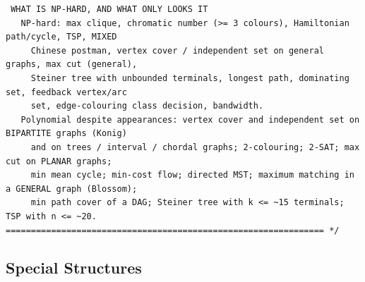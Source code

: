 \documentclass[9pt,a4paper,twocolumn]{extarticle}
\begin{document}
\begin{lstlisting}
 WHAT IS NP-HARD, AND WHAT ONLY LOOKS IT
   NP-hard: max clique, chromatic number (>= 3 colours), Hamiltonian path/cycle, TSP, MIXED
     Chinese postman, vertex cover / independent set on general graphs, max cut (general),
     Steiner tree with unbounded terminals, longest path, dominating set, feedback vertex/arc
     set, edge-colouring class decision, bandwidth.
   Polynomial despite appearances: vertex cover and independent set on BIPARTITE graphs (Konig)
     and on trees / interval / chordal graphs; 2-colouring; 2-SAT; max cut on PLANAR graphs;
     min mean cycle; min-cost flow; directed MST; maximum matching in a GENERAL graph (Blossom);
     min path cover of a DAG; Steiner tree with k <= ~15 terminals; TSP with n <= ~20.
=============================================================== */
\end{lstlisting}

\subsection{Special Structures}

\filbreak
\end{document}
